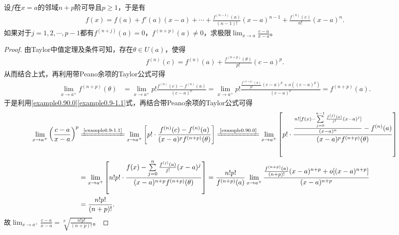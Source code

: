 \documentclass[../../main.tex]{subfiles}%
\begin{document}
\begin{example}
设$f$在$x = a$的邻域$n + p$阶可导且$p\geqslant  1$，于是有
\begin{align}
f(x) = f(a) + f'(a)(x - a) + \cdots + \frac{f^{(n - 1)}(a)}{(n - 1)!}(x - a)^{n - 1} + \frac{f^{(n)}(c)}{n!}(x - a)^n.\label{example0.90.0}
\end{align}
如果对于$j = 1,2,\cdots,p - 1$都有$f^{(n + j)}(a) = 0$，$f^{(n + p)}(a)\neq 0$，求极限$\lim_{x\to a}\frac{c - a}{x - a}$。 
\end{example}
\begin{proof}
由Taylor中值定理及条件可知，存在$\theta\in U(a)$，使得
\begin{align}
f^{(n)}(c) = f^{(n)}(a) + \frac{f^{(n + p)}(\theta)}{p!}(c - a)^p. \label{example0.9-1.1}
\end{align}
从而结合上式，再利用带Peano余项的Taylor公式可得
\begin{align*}
\lim_{x\to a^+}f^{(n + p)}(\theta) &= \lim_{x\to a^+}p!\frac{f^{(n)}(c) - f^{(n)}(a)}{(c - a)^p} = \lim_{x\to a^+}p!\frac{\frac{f^{(n + p)}(a)}{p!}(c - a)^p + o((c - a)^p)}{(c - a)^p} = f^{(n + p)}(a).
\end{align*}
于是利用\eqref{example0.90.0}\eqref{example0.9-1.1}式，再结合带Peano余项的Taylor公式可得
\begin{align*}
\lim_{x\to a^+}\left(\frac{c - a}{x - a}\right)^p &\xlongequal{\text{\eqref{example0.9-1.1}}} \lim_{x\to a^+}\left[p!\cdot\frac{f^{(n)}(c) - f^{(n)}(a)}{(x - a)^pf^{(n + p)}(\theta)}\right] \xlongequal{\text{\eqref{example0.90.0}}} \lim_{x\to a^+}\left[p!\cdot\frac{\frac{n![f(x) - \sum\limits_{j = 0}^{n - 1}\frac{f^{(j)}(a)}{j!}(x - a)^j]}{(x - a)^n} - f^{(n)}(a)}{(x - a)^pf^{(n + p)}(\theta)}\right]\\
&= \lim_{x\to a^+}\left[n!p!\cdot\frac{f(x) - \sum\limits_{j = 0}^n\frac{f^{(j)}(a)}{j!}(x - a)^j}{(x - a)^{n + p}f^{(n + p)}(\theta)}\right] = \frac{n!p!}{f^{(n + p)}(a)}\lim_{x\to a^+}\frac{\frac{f^{(n + p)}(a)}{(n + p)!}(x - a)^{n + p} + o[(x - a)^{n + p}]}{(x - a)^{n + p}} 
\\
&= \frac{n!p!}{(n + p)!}.
\end{align*}
故$\lim_{x\to a^+}\frac{c - a}{x - a} = \sqrt[p]{\frac{n!p!}{(n + p)!}}$。 
\end{proof}
\end{document}
